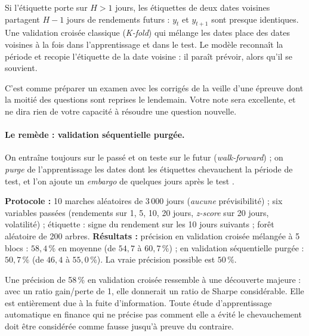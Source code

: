 Si l'étiquette porte sur $H > 1$ jours, les étiquettes de deux dates voisines partagent $H-1$ jours de rendements futurs : $y_t$ et $y_{t+1}$ sont presque identiques. Une validation croisée classique (\emph{K-fold}) qui mélange les dates place des dates voisines à la fois dans l'apprentissage et dans le test. Le modèle \og reconnaît\fg{} la période et recopie l'étiquette de la date voisine : il paraît prévoir, alors qu'il se souvient.

\begin{intuition}
C'est comme préparer un examen avec les corrigés de la veille d'une épreuve dont la moitié des questions sont reprises le lendemain. Votre note sera excellente, et ne dira rien de votre capacité à résoudre une question nouvelle.
\end{intuition}

\paragraph{Le remède : validation séquentielle purgée.} On entraîne toujours sur le passé et on teste sur le futur (\emph{walk-forward}) ; on \emph{purge} de l'apprentissage les dates dont les étiquettes chevauchent la période de test, et l'on ajoute un \emph{embargo} de quelques jours après le test \citep{lopezdeprado2018}.

\begin{codebox}
\textbf{Protocole :} 10 marches aléatoires de 3\,000 jours (\emph{aucune} prévisibilité) ; six variables passées (rendements sur 1, 5, 10, 20 jours, \emph{z-score} sur 20 jours, volatilité) ; étiquette : signe du rendement sur les 10 jours suivants ; forêt aléatoire de 200 arbres. \textbf{Résultats :} précision en validation croisée mélangée à 5 blocs : $58{,}4\,\%$ en moyenne (de $54{,}7$ à $60{,}7\,\%$) ; en validation séquentielle purgée : $50{,}7\,\%$ (de $46{,}4$ à $55{,}0\,\%$). La vraie précision possible est $50\,\%$.
\end{codebox}

\begin{pitfall}
Une précision de 58\,\% en validation croisée ressemble à une découverte majeure : avec un ratio gain/perte de 1, elle donnerait un ratio de Sharpe considérable. Elle est entièrement due à la fuite d'information. Toute étude d'apprentissage automatique en finance qui ne précise pas comment elle a évité le chevauchement doit être considérée comme fausse jusqu'à preuve du contraire.
\end{pitfall}

